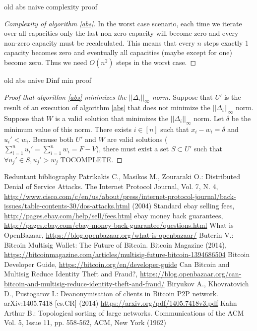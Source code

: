 old abs naive complexity proof
\begin{proof}[Complexity of algorithm \ref{abs}]
   In the worst case scenario, each time we iterate over all capacities only the last non-zero capacity will become zero
   and every non-zero capacity must be recalculated. This means that every $n$ steps exactly 1 capacity becomes zero
   and eventually all capacities (maybe except for one) become zero. Thus we need $O(n^2)$ steps in the worst case.
\end{proof}

old abs naive Dinf min proof
\begin{proof}[Proof that algorithm \ref{abs} minimizes the $||\Delta_i||_\infty$ norm]
   Suppose that $U'$ is the result of an execution of algorithm \ref{abs} that does not minimize the $||\Delta_i||_\infty$
   norm. Suppose that $W$ is a valid solution that minimizes the $||\Delta_i||_\infty$ norm. Let $\delta$ be the minimum
   value of this norm. There exists $i \in [n]$ such that $x_i - w_i = \delta$ and $u_i' < w_i$. Because both $U'$
   and $W$ are valid solutions ($\sum\limits_{i=1}^{n}u_i' = \sum\limits_{i=1}^{n}w_i = F - V$), there must exist a set
   $S \subset U'$ such that $\forall u_j' \in S, u_j' > w_j$ TOCOMPLETE.
\end{proof}

Reduntant bibliography
     Patrikakis C., Masikos M., Zouraraki O.: Distributed Denial of Service Attacks. The Internet Protocol Journal, Vol. 7,
     N. 4,
     \url{http://www.cisco.com/c/en/us/about/press/internet-protocol-journal/back-issues/table-contents-30/dos-attacks.html}
     (2004)
     Standard ebay selling fees, \url{http://pages.ebay.com/help/sell/fees.html}
     ebay money back guarantees, \url{http://pages.ebay.com/ebay-money-back-guarantee/questions.html}
     What is OpenBazaar, \url{https://blog.openbazaar.org/what-is-openbazaar/}
     Buterin V.: Bitcoin Multisig Wallet: The Future of Bitcoin. Bitcoin Magazine (2014),
     \url{https://bitcoinmagazine.com/articles/multisig-future-bitcoin-1394686504}
     Bitcoin Developer Guide, \url{https://bitcoin.org/en/developer-guide}
     Can Bitcoin and Multisig Reduce Identity Theft and Fraud?,
     \url{https://blog.openbazaar.org/can-bitcoin-and-multisig-reduce-identity-theft-and-fraud/}
     Biryukov A., Khovratovich D., Pustogarov I.: Deanonymisation of clients in Bitcoin P2P network. arXiv:1405.7418 [cs.CR]
     (2014)
     \url{https://arxiv.org/pdf/1405.7418v3.pdf}
     Kahn Arthur B.: Topological sorting of large networks. Communications of the ACM Vol. 5, Issue 11, pp. 558-562, ACM,
     New York (1962)
